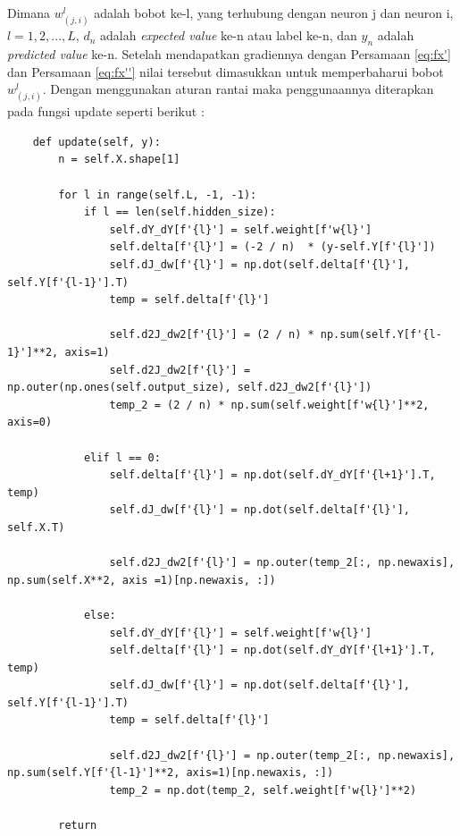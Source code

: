 Dimana $w^l_{(j,i)}$ adalah bobot ke-l, yang terhubung dengan neuron j dan neuron i, $l=1, 2, ...,L$, $d_n$ adalah \textit{expected value} ke-n atau label ke-n, dan $y_n$ adalah \textit{predicted value} ke-n. Setelah mendapatkan gradiennya dengan Persamaan \ref{eq:fx'} dan Persamaan \ref{eq:fx''} nilai tersebut dimasukkan untuk memperbaharui bobot $w^l_{(j,i)}$. Dengan menggunakan aturan rantai maka penggunaannya diterapkan pada fungsi update seperti berikut :

\begin{lstlisting}
    def update(self, y):
        n = self.X.shape[1]

        for l in range(self.L, -1, -1):
            if l == len(self.hidden_size):
                self.dY_dY[f'{l}'] = self.weight[f'w{l}']
                self.delta[f'{l}'] = (-2 / n)  * (y-self.Y[f'{l}'])
                self.dJ_dw[f'{l}'] = np.dot(self.delta[f'{l}'], self.Y[f'{l-1}'].T)
                temp = self.delta[f'{l}']

                self.d2J_dw2[f'{l}'] = (2 / n) * np.sum(self.Y[f'{l-1}']**2, axis=1)
                self.d2J_dw2[f'{l}'] = np.outer(np.ones(self.output_size), self.d2J_dw2[f'{l}'])
                temp_2 = (2 / n) * np.sum(self.weight[f'w{l}']**2, axis=0)

            elif l == 0:
                self.delta[f'{l}'] = np.dot(self.dY_dY[f'{l+1}'].T, temp)
                self.dJ_dw[f'{l}'] = np.dot(self.delta[f'{l}'], self.X.T)

                self.d2J_dw2[f'{l}'] = np.outer(temp_2[:, np.newaxis], np.sum(self.X**2, axis =1)[np.newaxis, :])

            else:
                self.dY_dY[f'{l}'] = self.weight[f'w{l}']
                self.delta[f'{l}'] = np.dot(self.dY_dY[f'{l+1}'].T, temp)
                self.dJ_dw[f'{l}'] = np.dot(self.delta[f'{l}'], self.Y[f'{l-1}'].T)
                temp = self.delta[f'{l}']

                self.d2J_dw2[f'{l}'] = np.outer(temp_2[:, np.newaxis], np.sum(self.Y[f'{l-1}']**2, axis=1)[np.newaxis, :])
                temp_2 = np.dot(temp_2, self.weight[f'w{l}']**2)

        return
\end{lstlisting}

